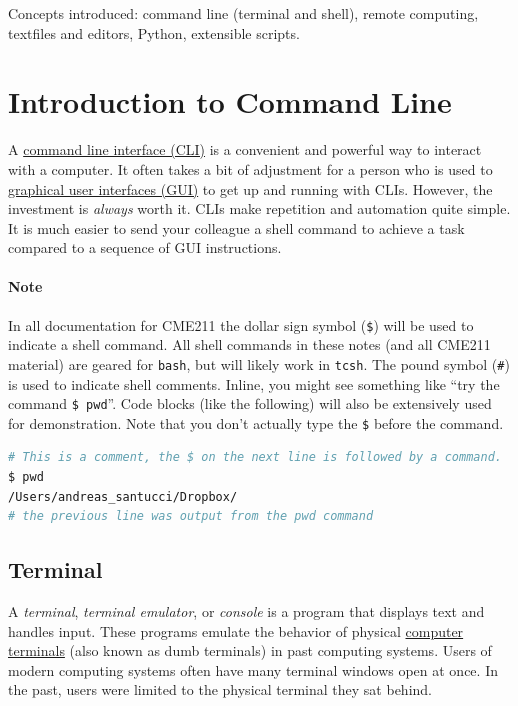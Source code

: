 \documentclass[12pt,letterpaper,twoside]{article}
\begin{document}
Concepts introduced: command line (terminal and shell), remote
computing, textfiles and editors, Python, extensible scripts.

\section{Introduction to Command Line}
A \href{https://en.wikipedia.org/wiki/Command-line_interface}{command line interface (CLI)} 
is a convenient and powerful way to interact with
a computer.  It often takes a bit of adjustment for a person who is used to
\href{https://en.wikipedia.org/wiki/Graphical_user_interface}{graphical user interfaces (GUI)} 
to get up and running with CLIs.  However, the
investment is \emph{always} worth it.  CLIs make repetition and automation quite
simple.  It is much easier to send your colleague a shell command to achieve a
task compared to a sequence of GUI instructions.

\paragraph{Note}
In all documentation for CME211 the dollar sign symbol (\texttt{\$}) will be
used to indicate a shell command.  All shell commands in these notes (and all
CME211 material) are geared for \texttt{bash}, but will likely work in \texttt{tcsh}.  The
pound symbol (\texttt{\#}) is used to indicate shell comments.  Inline, you might see
something like ``try the command \texttt{\$ pwd}''.  Code blocks (like the following)
will also be extensively used for demonstration.  Note that you don't actually
type the \texttt{\$} before the command.

\begin{lstlisting}[language=bash]
# This is a comment, the $ on the next line is followed by a command.
$ pwd
/Users/andreas_santucci/Dropbox/
# the previous line was output from the pwd command
\end{lstlisting}
\vspace{-8pt}
\subsection{Terminal}
A \emph{terminal}, \emph{terminal emulator}, or \emph{console} is a program that displays
text and handles input. These programs emulate the behavior of physical
\href{https://en.wikipedia.org/wiki/Computer_terminal}{computer terminals} (also
known as dumb terminals) in past computing systems. Users of modern computing
systems often have many terminal windows open at once. In the past, users were
limited to the physical terminal they sat behind.
\vspace{-12pt}
\end{document}
